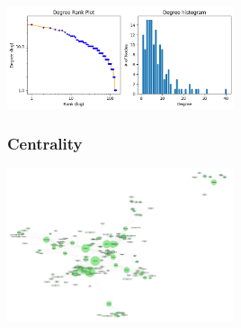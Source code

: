 \documentclass[10pt,twocolumn,letterpaper]{article}
\begin{document}
\begin{center}
    \includegraphics[width=0.5\textwidth]{img/s6/degree_plot.jpg}
\end{center}


\subsubsection{Centrality}


\begin{center}
    \includegraphics[width=0.5\textwidth]{img/s6/pagerank_graph.jpg}
\end{center}
\end{document}
